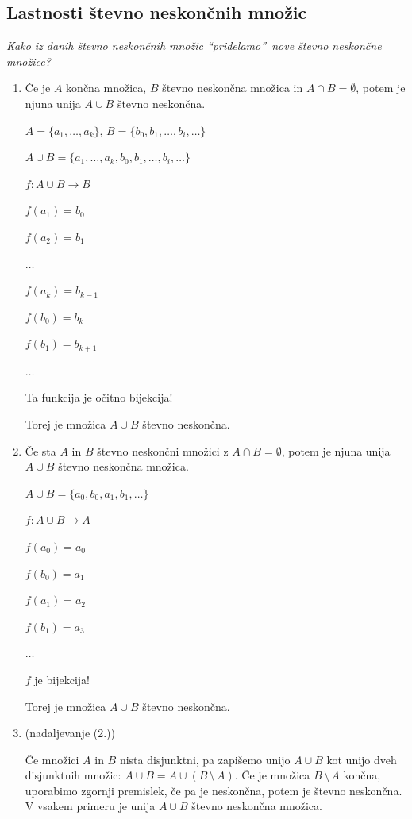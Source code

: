 \documentclass[11pt,paper=b5,footinclude,headinclude]{scrbook} %
\def\brez {{\,\setminus\,}}
\begin{document}
\subsection{Lastnosti števno neskončnih množic}

{\em Kako iz danih števno neskončnih množic ``pridelamo''~nove števno neskončne množice?}

\begin{enumerate}[(1.)]
\item Če je $A$ končna množica, $B$ števno neskončna množica in $A\cap B = \emptyset$, potem je njuna unija $A\cup B$ števno neskončna.

$A = \{a_1,\ldots, a_k\}$, $B = \{b_0,b_1,\ldots, b_i, \ldots\}$

$A\cup B = \{a_1,\ldots, a_k, b_0,b_1,\ldots, b_i, \ldots\}$

$f:A\cup B \to B$

$f(a_1) = b_0$

$f(a_2) = b_1$

$\ldots$

$f(a_k) = b_{k-1}$

$f(b_0) = b_k$

$f(b_1) = b_{k+1}$

$\ldots$

Ta funkcija je očitno bijekcija!

Torej je množica $A\cup B$ števno neskončna.

\item Če sta $A$ in $B$ števno neskončni množici z $A\cap B = \emptyset$, potem je njuna unija $A\cup B$ števno neskončna množica.

$A\cup B = \{a_0,b_0,a_1,b_1,\ldots\}$

$f:A\cup B\to A$

$f(a_0) = a_0$

$f(b_0) = a_1$

$f(a_1) = a_2$

$f(b_1) = a_3$

$\ldots$

$f$ je bijekcija!

Torej je množica $A\cup B$ števno neskončna.

\item (nadaljevanje (2.))

Če množici $A$ in $B$ nista disjunktni, pa zapišemo unijo $A\cup B$ kot unijo dveh
disjunktnih množic: $A\cup B=A\cup (B\brez A)$. Če je množica $B\brez A$ končna, uporabimo zgornji
premislek, če pa je neskončna, potem je števno neskončna.
V vsakem primeru je unija $A\cup B$ števno neskončna množica.


\end{enumerate}
\end{document}
